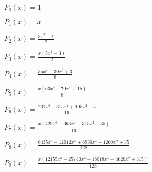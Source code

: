 \documentclass[11pt]{article}
\begin{document}
    $P_0(x) = 1$

    
    $P_1(x) = x$

    
    $P_2(x) = \frac{3 x^{2} - 1}{2}$

    
    $P_3(x) = \frac{x \left(5 x^{2} - 3\right)}{2}$

    
    $P_4(x) = \frac{35 x^{4} - 30 x^{2} + 3}{8}$

    
    $P_5(x) = \frac{x \left(63 x^{4} - 70 x^{2} + 15\right)}{8}$

    
    $P_6(x) = \frac{231 x^{6} - 315 x^{4} + 105 x^{2} - 5}{16}$

    
    $P_7(x) = \frac{x \left(429 x^{6} - 693 x^{4} + 315 x^{2} - 35\right)}{16}$

    
    $P_8(x) = \frac{6435 x^{8} - 12012 x^{6} + 6930 x^{4} - 1260 x^{2} + 35}{128}$

    
    $P_9(x) = \frac{x \left(12155 x^{8} - 25740 x^{6} + 18018 x^{4} - 4620 x^{2} + 315\right)}{128}$

    

    
    
    
\end{document}
